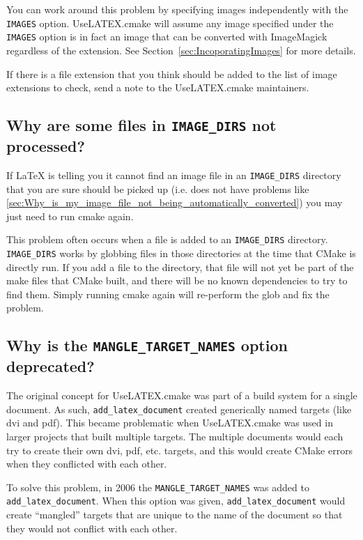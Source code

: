 \documentclass{article}
\newcommand*{\textfile}[1]{\textsf{#1}}
\newcommand*{\textprog}[1]{\textfile{#1}}
\newcommand*{\textcmake}[1]{\texttt{#1}}
\newcommand*{\textmaketarget}[1]{#1}
\newcommand*{\UseLATEX}{\textfile{UseLATEX.cmake}\xspace}
\newcommand*{\latex}{\LaTeX\xspace}
\newcommand*{\ald}{\textcmake{add\_latex\_document}\xspace}
\begin{document}
  You can work around this problem by specifying images independently with
  the \textcmake{IMAGES} option. \UseLATEX will assume any image specified
  under the \textcmake{IMAGES} option is in fact an image that can be
  converted with ImageMagick regardless of the extension. See
  Section~\ref{sec:IncoporatingImages} for more details.

  If there is a file extension that you think should be added to the list
  of image extensions to check, send a note to the \UseLATEX maintainers.

  \subsection{Why are some files in \textcmake{IMAGE\_DIRS} not processed?}
  \label{sec:Why_are_some_files_in_IMAGE_DIRS_not_processed}

  If \latex is telling you it cannot find an image file in an \textcmake{IMAGE\_DIRS} directory that you are sure should be picked up (i.e. does not have problems like \ref{sec:Why_is_my_image_file_not_being_automatically_converted}) you may just need to run \textprog{cmake} again.

  This problem often occurs when a file is added to an \textcmake{IMAGE\_DIRS} directory.
  \textcmake{IMAGE\_DIRS} works by globbing files in those directories at the time that CMake is directly run.
  If you add a file to the directory, that file will not yet be part of the make files that CMake built, and there will be no known dependencies to try to find them.
  Simply running \textprog{cmake} again will re-perform the glob and fix the problem.

  \subsection{Why is the \textcmake{MANGLE\_TARGET\_NAMES} option deprecated?}
  \label{sec:Why_is_the_MANGLE_TARGET_NAMES_option_deprecated}

  The original concept for \UseLATEX was part of a build system for a
  single document. As such, \ald created generically named targets (like
  \textmaketarget{dvi} and \textmaketarget{pdf}). This became problematic
  when \UseLATEX was used in larger projects that built multiple targets.
  The multiple documents would each try to create their own
  \textmaketarget{dvi}, \textmaketarget{pdf}, etc. targets, and this would
  create CMake errors when they conflicted with each other.

  To solve this problem, in 2006 the \textcmake{MANGLE\_TARGET\_NAMES} was
  added to \ald. When this option was given, \ald would create ``mangled''
  targets that are unique to the name of the document so that they would
  not conflict with each other.
\end{document}
